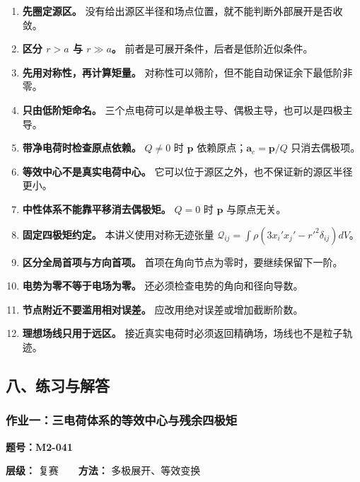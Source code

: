 \begin{enumerate}
\def\labelenumi{\arabic{enumi}.}
\tightlist
\item
  \textbf{先圈定源区。}
  没有给出源区半径和场点位置，就不能判断外部展开是否收敛。
\item
  \textbf{区分 \(r>a\) 与 \(r\gg a\)。}
  前者是可展开条件，后者是低阶近似条件。
\item
  \textbf{先用对称性，再计算矩量。}
  对称性可以筛阶，但不能自动保证余下最低阶非零。
\item
  \textbf{只由低阶矩命名。}
  三个点电荷可以是单极主导、偶极主导，也可以是四极主导。
\item
  \textbf{带净电荷时检查原点依赖。} \(Q\ne0\) 时 \(\mathbf p\)
  依赖原点；\(\mathbf a_c=\mathbf p/Q\) 只消去偶极项。
\item
  \textbf{等效中心不是真实电荷中心。}
  它可以位于源区之外，也不保证新的源区半径更小。
\item
  \textbf{中性体系不能靠平移消去偶极矩。} \(Q=0\) 时 \(\mathbf p\)
  与原点无关。
\item
  \textbf{固定四极矩约定。} 本讲义使用对称无迹张量
  \(\mathcal Q_{ij}=\int\rho(3x_i'x_j'-r'^2\delta_{ij})dV\)。
\item
  \textbf{区分全局首项与方向首项。}
  首项在角向节点为零时，要继续保留下一阶。
\item
  \textbf{电势为零不等于电场为零。} 还必须检查电势的角向和径向导数。
\item
  \textbf{节点附近不要滥用相对误差。} 应改用绝对误差或增加截断阶数。
\item
  \textbf{理想场线只用于远区。}
  接近真实电荷时必须返回精确场，场线也不是粒子轨迹。
\end{enumerate}

\subsection{八、练习与解答}\label{m2:ux516bux7ec3ux4e60ux4e0eux89e3ux7b54-2}

\subsubsection{作业一：三电荷体系的等效中心与残余四极矩}\label{m2:ux4f5cux4e1aux4e00ux4e09ux7535ux8377ux4f53ux7cfbux7684ux7b49ux6548ux4e2dux5fc3ux4e0eux6b8bux4f59ux56dbux6781ux77e9}

\textbf{题号：M2-041}

\textbf{层级：} 复赛　　\textbf{方法：} 多极展开、等效变换

